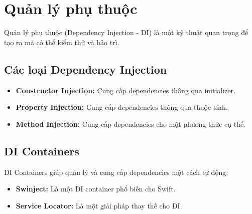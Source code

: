 \section{Quản lý phụ thuộc}
Quản lý phụ thuộc (Dependency Injection - DI) là một kỹ thuật quan trọng để tạo ra mã có thể kiểm thử và bảo trì.

\subsection{Các loại Dependency Injection}
\begin{itemize}
  \item \textbf{Constructor Injection:} Cung cấp dependencies thông qua initializer.
  \item \textbf{Property Injection:} Cung cấp dependencies thông qua thuộc tính.
  \item \textbf{Method Injection:} Cung cấp dependencies cho một phương thức cụ thể.
\end{itemize}

\subsection{DI Containers}
DI Containers giúp quản lý và cung cấp dependencies một cách tự động:
\begin{itemize}
  \item \textbf{Swinject:} Là một DI container phổ biến cho Swift.
  \item \textbf{Service Locator:} Là một giải pháp thay thế cho DI.
\end{itemize}
